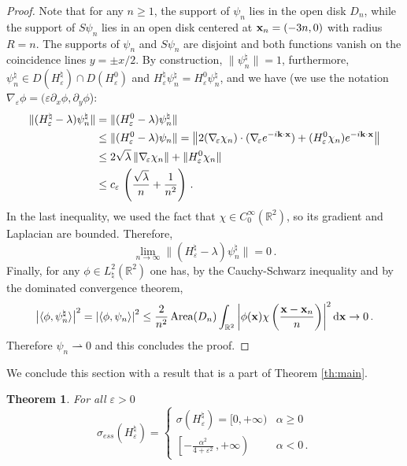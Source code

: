 \documentclass[a4paper,11pt,reqno]{amsart}
\newtheorem{theorem}{Theorem}[section]
\theoremstyle{definition}
\numberwithin{equation}{section}
\newcommand{\RE}{\mathbb R}
\newcommand{\ve}{\varepsilon}
\renewcommand{\d}{\mathrm{d}}
\newcommand{\x}{{\bf  x}}
\renewcommand{\k}{{\bf k}}
\newcommand{\bosfer}{{\natural}}
\begin{document}
\begin{proof}
Note that for any $n \geq 1$, the support of $\psi_{n}$  lies in the  open disk  $D_n$, while the support of $S\psi_{n}$  lies in an  open disk  centered at $\x_{n}=(-3n,0) $ with radius $R=n$. The supports of $\psi_n$ and $S\psi_n$ are disjoint and both functions vanish on the coincidence lines $y = \pm x/2$. By construction,  $\| \psi^{\bosfer}_{n}\| = 1$, furthermore,  $\psi_n^{\bosfer} \in D(H^\bosfer_\ve)\cap D( H^0_\ve )$ and $H^\bosfer_\ve \psi_n^{\bosfer} =  H^0_\ve \psi_n^{\bosfer}$, and we have (we use the notation $\nabla_{\!\ve} \phi= (\ve\partial_x\phi, \partial_y\phi $): 
    \begin{equation*}
        \begin{split}
            \lVert (H^\bosfer_\ve - \lambda) \psi^{\bosfer}_{n} \rVert
            &=\lVert ( H^0_\ve - \lambda) \psi^{\bosfer}_{n} \rVert \\  
            &\leq  \lVert ( H^0_\ve - \lambda) \psi_{n} \rVert= \left\lVert 2 (\nabla_{\!\ve} \chi_n ) \cdot (\nabla_{\!\ve} e^{-i\k\cdot \x }) + (H^0_\ve \chi_n) e^{-i\k\cdot\x} \right\rVert\\
            &\leq 2 \sqrt \lambda\, \lVert \nabla_{\!\ve} \chi_n \rVert + \lVert H^0_\ve\chi_n  \rVert 
            \\&
            \leq c_{\ve}\,\left(\frac{\sqrt\lambda}{n} + \frac{1}{n^2} \right)\, .
        \end{split}
    \end{equation*}
    In the last inequality, we used the fact that $\chi\in C_{0}^\infty(\RE^2) $, so its gradient and Laplacian are bounded. Therefore,
    \begin{equation*}
        \lim_{n \to \infty} \lVert (H^\bosfer_\ve - \lambda) \psi^{\bosfer}_{n} \rVert = 0 \, .
    \end{equation*}
Finally, for any $\phi\in L^{2}_{\bosfer}(\RE^{2})$ one has, by the Cauchy-Schwarz inequality and by the dominated convergence theorem, 
\[
\left|\langle\phi,\psi^{\bosfer}_{n}\rangle \right|^{2}= \left|\langle\phi,\psi_{n}\rangle \right|^{2} \le   \frac{2} {n^{2}}\,\text{Area}(D_{n}) \int_{\RE^{2}}\left|\phi(\x)\chi\left(\frac{\x-\x_{n}}{n}\right)\right|^{2}
\d\x\to 0 \,.
\]
Therefore $\psi_{n} \rightharpoonup 0$ and this concludes the proof.
\end{proof}
We conclude this section with a result that is a  part of Theorem \ref{th:main}.
\begin{theorem}\label{th:spectrumHve}For all $\ve>0$
\[
\sigma_{ess}(H^{\bosfer}_\ve) = \begin{cases}
\sigma(H^{\bosfer}_\ve)=[0,+\infty)&\alpha\geq   0\\
\left[-\frac{\alpha^2}{4+\ve^{2}}\,,+\infty\right)&\alpha<0\,.
\end{cases}
\]
\end{theorem}
\end{document}
